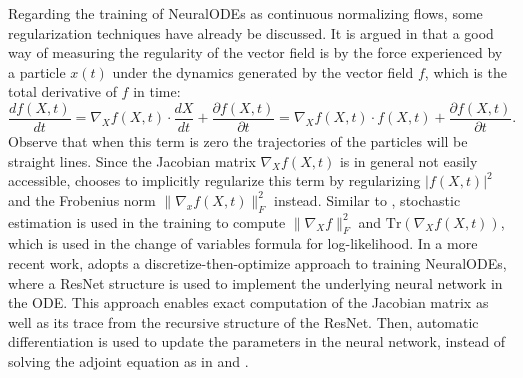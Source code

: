 Regarding the training of NeuralODEs as continuous normalizing flows,
some regularization techniques have already be discussed. It is argued
in \cite{HowToTrain} that a good way of measuring the regularity of
the vector field is by the force experienced by a particle $x(t)$
under the dynamics generated by the vector field $f$, which is the
total derivative of $f$ in time: 
\begin{equation}\label{eq:straightlinereg}
  \frac{df(X,t)}{dt} = \nabla_X f(X,t) \cdot \frac{dX}{dt} + \frac{\partial f(X,t)}{ \partial t} = \nabla_X f(X,t) \cdot f(X,t) + \frac{\partial f(X,t)}{\partial t}.
\end{equation}
Observe that when this term is zero the trajectories of the particles
will be straight lines. Since the Jacobian matrix $\nabla_X f(X,t)$ is
in general not easily accessible, \cite{HowToTrain} chooses to
implicitly regularize this term by regularizing $|f(X,t)|^2$ and the
Frobenius norm $\|\nabla_x f(X,t)\|_F^2$ instead. Similar to
\cite{ffjord}, stochastic estimation is used in the training to
compute $\|\nabla_X f\|_F^2$ and $\text{Tr}(\nabla_X f(X,t))$, which
is used in the change of variables formula for log-likelihood. In a
more recent work, \cite{OTFlow} adopts a discretize-then-optimize
approach to training NeuralODEs, where a ResNet structure is used to
implement the underlying neural network in the ODE. This approach
enables exact computation of the Jacobian matrix as well as its trace
from the recursive structure of the ResNet. Then, automatic
differentiation is used to update the parameters in the neural
network, instead of solving the adjoint equation as in \cite{ffjord}
and \cite{HowToTrain}.


